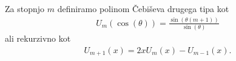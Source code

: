 \begin{izrek}
    
\end{izrek}

\begin{definicija}
    Za stopnjo \(m\) definiramo polinom Čebiševa drugega tipa kot 
    \begin{align*}
        U_m(\cos(\theta)) = \frac{\sin(\theta(m+1))}{\sin(\theta)}
    \end{align*}
    ali rekurzivno kot
    \begin{align*}
        U_{m+1}(x) = 2xU_m(x) - U_{m-1}(x).
    \end{align*}
\end{definicija}










